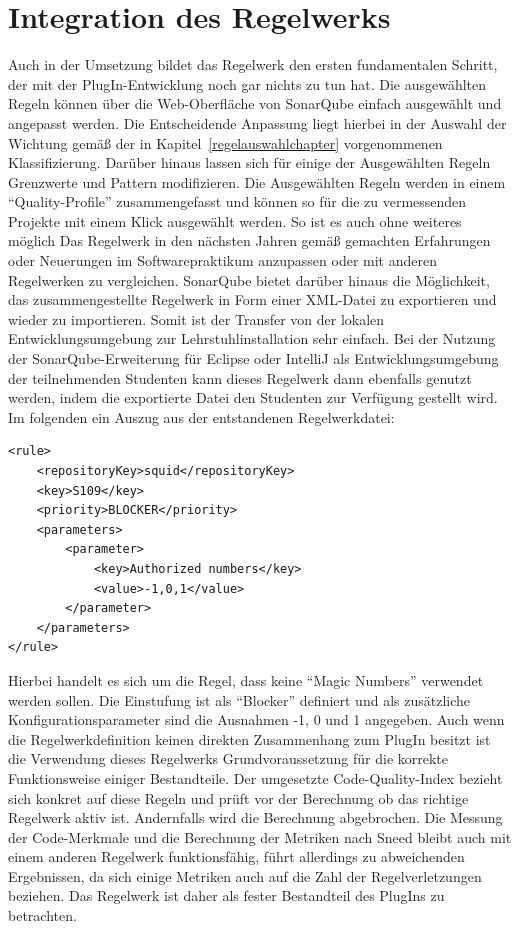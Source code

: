 \documentclass[da,ngerman]{stthesis}
\begin{document}
		\section{Integration des Regelwerks}
			Auch in der Umsetzung bildet das Regelwerk den ersten fundamentalen Schritt, der mit der PlugIn-Entwicklung noch gar nichts zu tun hat. Die ausgewählten Regeln können über die Web-Oberfläche von SonarQube einfach ausgewählt und angepasst werden. Die Entscheidende Anpassung liegt hierbei in der Auswahl der Wichtung gemäß der in Kapitel~\ref{regelauswahlchapter} vorgenommenen Klassifizierung. Darüber hinaus lassen sich für einige der Ausgewählten Regeln Grenzwerte und Pattern modifizieren. Die Ausgewählten Regeln werden in einem "`Quality-Profile"' zusammengefasst und können so für die zu vermessenden Projekte mit einem Klick ausgewählt werden. So ist es auch ohne weiteres möglich Das Regelwerk in den nächsten Jahren gemäß gemachten Erfahrungen oder Neuerungen im Softwarepraktikum anzupassen oder mit anderen Regelwerken zu vergleichen. \newline
			SonarQube bietet darüber hinaus die Möglichkeit, das zusammengestellte Regelwerk in Form einer XML-Datei zu exportieren und wieder zu importieren. Somit ist der Transfer von der lokalen Entwicklungsumgebung zur Lehrstuhlinstallation sehr einfach. Bei der Nutzung der SonarQube-Erweiterung für Eclipse oder IntelliJ als Entwicklungsumgebung der teilnehmenden Studenten kann dieses Regelwerk dann ebenfalls genutzt werden, indem die exportierte Datei den Studenten zur Verfügung gestellt wird. Im folgenden ein Auszug aus der entstandenen Regelwerkdatei:
			\lstset{language=XML}
			\begin{lstlisting}
<rule>
    <repositoryKey>squid</repositoryKey>
    <key>S109</key>
    <priority>BLOCKER</priority>
    <parameters>
        <parameter>
            <key>Authorized numbers</key>
            <value>-1,0,1</value>
        </parameter>
    </parameters>
</rule>
			\end{lstlisting} 
			Hierbei handelt es sich um die Regel, dass keine "`Magic Numbers"' verwendet werden sollen. Die Einstufung ist als "`Blocker"' definiert und als zusätzliche Konfigurationsparameter sind die Ausnahmen -1, 0 und 1 angegeben. \newline
			Auch wenn die Regelwerkdefinition keinen direkten Zusammenhang zum PlugIn besitzt ist die Verwendung dieses Regelwerks Grundvoraussetzung für die korrekte Funktionsweise einiger Bestandteile. Der umgesetzte Code-Quality-Index bezieht sich konkret auf diese Regeln und prüft vor der Berechnung ob das richtige Regelwerk aktiv ist. Andernfalls wird die Berechnung abgebrochen. Die Messung der Code-Merkmale und die Berechnung der Metriken nach Sneed bleibt auch mit einem anderen Regelwerk funktionsfähig, führt allerdings zu abweichenden Ergebnissen, da sich einige Metriken auch auf die Zahl der Regelverletzungen beziehen. Das Regelwerk ist daher als fester Bestandteil des PlugIns zu betrachten.
\end{document}
